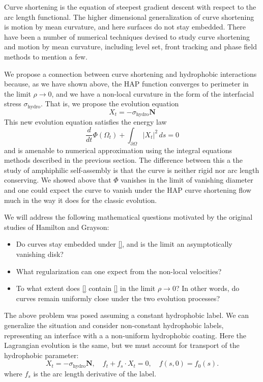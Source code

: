 \documentclass[12pt]{article}
\begin{document}
Curve shortening is the equation of steepest gradient descent with respect to the arc length functional. The higher dimensional generalization of curve shortening is motion by mean curvature, and here surfaces do not stay embedded. There have been a number of numerical 
techniques devised to study curve shortening and motion by mean curvature, including level set, front tracking and phase field methods to mention a few. 

We propose a connection between curve shortening and hydrophobic interactions because, as 
we have shown above, the HAP function converges to perimeter in the limit $\rho \to 0$, and  
we have a non-local curvature in the form of the interfacial stress $\sigma_{\text{hydro}}$.
That is, we propose the evolution equation
\begin{equation}
    X_t = - \sigma_{\text{hydro}} \mathbf{N}
\end{equation}
This new evolution equation satisfies the energy law 
\begin{equation}
    \frac{d}{dt}\Phi(\Omega_t) + \int_{\partial \Omega} |X_t|^2 \,ds = 0  
\end{equation}
and is amenable to numerical approximation using the integral equations methods
described in the previous section. The difference between this a the study of amphiphilic
self-assembly is that the curve is neither rigid nor arc length conserving.
We showed above that $\Phi$ vanishes
in the limit of vanishing diameter and one could expect the curve to vanish under the 
HAP curve shortening flow much in the way it does for the classic evolution. 

We will address the following mathematical questions motivated by the original studies
of Hamilton and Grayson: 
\begin{itemize}
\item Do curves stay embedded under \eqref{}, and is the limit an asymptotically vanishing disk?
\item What regularization can one expect from the non-local velocities? 
\item To what extent does \eqref{} contain \eqref{} in the limit $\rho \to 0$? In other words, do curves remain uniformly close under the two evolution processes? 
\end{itemize}

The above problem was posed assuming a constant hydrophobic label. We can generalize the 
situation and consider non-constant hydrophobic labels, representing an interface with a
a non-uniform hydrophobic coating. Here the Lagrangian evolution is the same, but we must
account for transport of the hydrophobic parameter:
\begin{equation}
     X_t = - \sigma_{\text{hydro}} \mathbf{N},\quad
     f_t + f_s \cdot X_t = 0,\quad f(s,0) = f_0(s).
\end{equation}
where $f_s$ is the arc length derivative of the label. 


\end{document}
